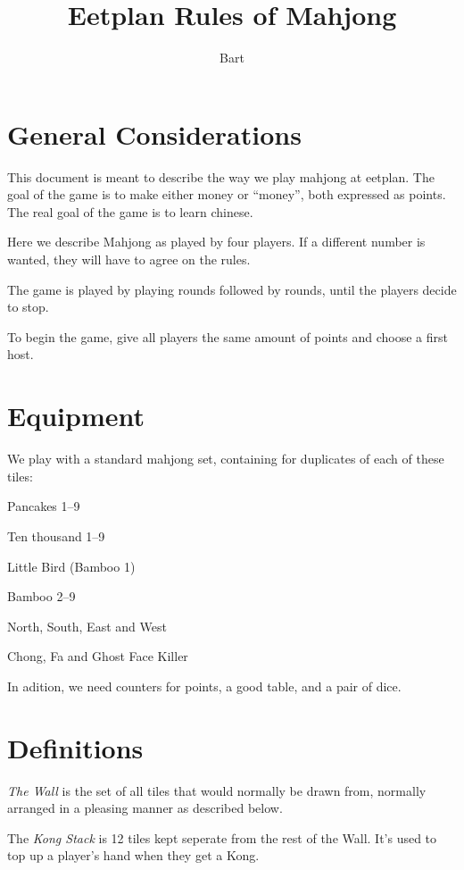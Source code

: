 \documentclass{article}
\begin{document}
\title{Eetplan Rules of Mahjong}
\author{Bart}
\maketitle

\section{General Considerations}
This document is meant to describe the way we play mahjong at eetplan. The goal of the game is to make either money or ``money'', both expressed as points. The real goal of the game is to learn chinese.

Here we describe Mahjong as played by four players. If a different number is wanted, they will have to agree on the rules.

The game is played by playing rounds followed by rounds, until the players decide to stop.

To begin the game, give all players the same amount of points and choose a first host.

\section{Equipment}
We play with a standard mahjong set, containing for duplicates of each of these tiles:
\begin{itemize*}
    \item Pancakes 1--9
    \item Ten thousand 1--9
    \item Little Bird (Bamboo 1)
    \item Bamboo 2--9
    \item North, South, East and West
    \item Chong, Fa and Ghost Face Killer
\end{itemize*}

In adition, we need counters for points, a good table, and a pair of dice.

\section{Definitions}
\emph{The Wall} is the set of all tiles that would normally be drawn from, normally arranged in a pleasing manner as described below.

The \emph{Kong Stack} is 12 tiles kept seperate from the rest of the Wall. It's used to top up a player's hand when they get a Kong.
\end{document}
